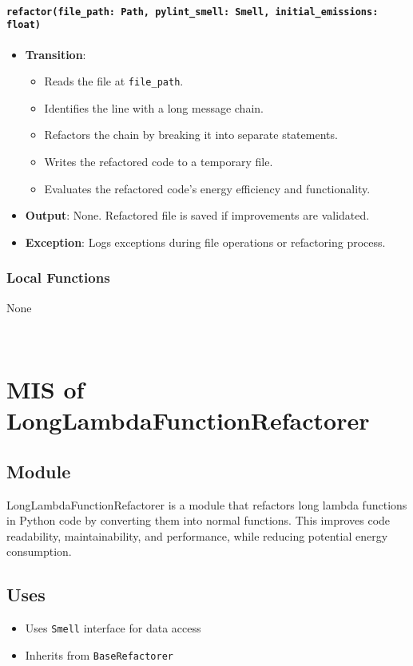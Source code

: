 \documentclass[12pt, titlepage]{article}
\begin{document}
\paragraph{\texttt{refactor(file\_path: Path, pylint\_smell: Smell, initial\_emissions: float)}}
\begin{itemize}
  \item \textbf{Transition}:
    \begin{itemize}
    \item Reads the file at \texttt{file\_path}.
    \item Identifies the line with a long message chain.
    \item Refactors the chain by breaking it into separate statements.
    \item Writes the refactored code to a temporary file.
    \item Evaluates the refactored code’s energy efficiency and functionality.
    \end{itemize}
  \item \textbf{Output}: None. Refactored file is saved if improvements are validated.
  \item \textbf{Exception}: Logs exceptions during file operations or refactoring process.
\end{itemize}

\subsubsection{Local Functions}
None

~\newpage

\section{MIS of LongLambdaFunctionRefactorer}

\subsection{Module}
LongLambdaFunctionRefactorer is a module that refactors 
long lambda functions in Python code by converting them into normal functions. 
This improves code readability, maintainability, and performance, while reducing potential energy consumption.

\subsection{Uses}
\begin{itemize}
  \item Uses \texttt{Smell} interface for data access
  \item Inherits from \texttt{BaseRefactorer}
\end{itemize}
\end{document}
